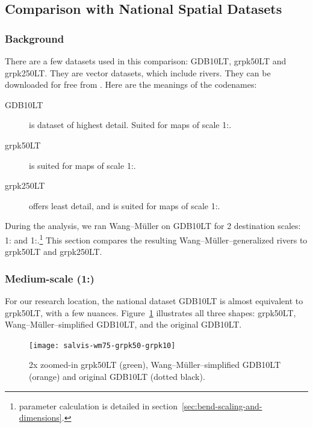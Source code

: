 \documentclass[a4paper]{article}
\newcommand{\WM}{Wang--M{\"u}ller}
\begin{document}
\subsection{Comparison with National Spatial Datasets}

\subsubsection{Background}

There are a few datasets used in this comparison: GDB10LT, grpk50LT and
grpk250LT. They are vector datasets, which include rivers. They can be
downloaded for free from \cite{nzt}. Here are the meanings of the codenames:

\begin{description}

    \item[GDB10LT] is dataset of highest detail. Suited for maps of scale
        1:.

    \item[grpk50LT] is suited for maps of scale 1:.

    \item[grpk250LT] offers least detail, and is suited for maps of
        scale 1:.

\end{description}

During the analysis, we ran {\WM} on GDB10LT for 2 destination scales:
1: and 1:.\footnote{parameter calculation is
detailed in section~\ref{sec:bend-scaling-and-dimensions}.} This section
compares the resulting {\WM}--generalized rivers to grpk50LT and grpk250LT.

\subsubsection{Medium-scale (1:)}

For our research location, the national dataset GDB10LT is almost equivalent to
grpk50LT, with a few nuances. Figure~\ref{fig:salvis-wm75-grpk50-grpk10} illustrates
all three shapes: grpk50LT, {\WM}--simplified GDB10LT, and the original GDB10LT.

\begin{figure}[h!]
    \centering
    \texttt{[image: salvis-wm75-grpk50-grpk10]}

    \caption{2x zoomed-in grpk50LT (green), {\WM}--simplified GDB10LT (orange)
    and original GDB10LT (dotted black).}

    \label{fig:salvis-wm75-grpk50-grpk10}
\end{figure}
\end{document}
